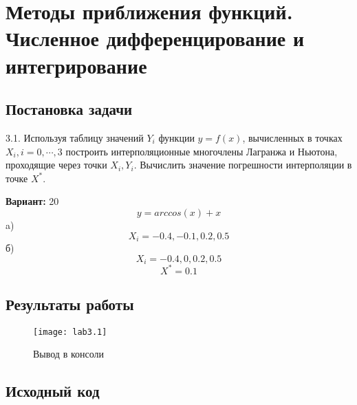 \section{Методы приближения функций. Численное дифференцирование и интегрирование}

\subsection{Постановка задачи}
3.1. Используя таблицу значений $Y_i$ функции $y=f(x)$, вычисленных в точках $X_i, i=0,\cdots,3$ построить интерполяционные многочлены Лагранжа и Ньютона, проходящие через точки ${X_i, Y_i}$.  Вычислить значение погрешности интерполяции в точке $X^*$.

{\bfseries Вариант:} 20
    \begin{equation}
        y = arccos(x) + x
    \end{equation}
    a)
    \begin{equation}
        X_i = -0.4, -0.1, 0.2, 0.5
    \end{equation}
    б)
    \begin{equation}
        X_i = -0.4, 0, 0.2, 0.5
    \end{equation}
    \begin{equation}
        X^* = 0.1
    \end{equation}
\pagebreak

\subsection{Результаты работы}
\begin{figure}[h!]
\centering
\texttt{[image: lab3.1]}
\caption{Вывод в консоли}
\end{figure}


\subsection{Исходный код}


\pagebreak